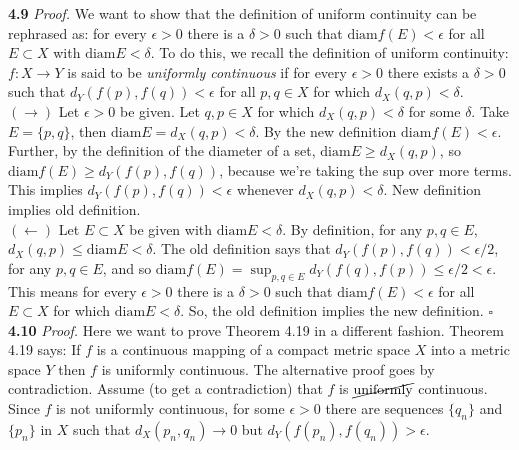 \documentclass[11pt]{article}
\begin{document}
\noindent \textbf{4.9}   
\noindent \textit{Proof.} We want to show that the definition of uniform continuity can be rephrased as: for every $\epsilon > 0$ there is a $\delta > 0$ such that $\text{diam} f(E) < \epsilon$ for all $E \subset X$ with $\text{diam}E < \delta$. To do this, we recall the definition of uniform continuity: $f: X \to Y$ is said to be \textit{uniformly continuous} if for every $\epsilon > 0$ there exists a $\delta > 0$ such that $d_Y(f(p), f(q)) < \epsilon$ for all $p,q \in X$ for which $d_X(q,p) < \delta$.\\

\noindent $(\rightarrow)$ Let $\epsilon > 0$ be given. Let $q,p\in X$ for which $d_X(q,p) < \delta$ for some $\delta$. Take $E = \{p,q \}$, then $\text{diam} E = d_X(q,p) < \delta$. By the new definition $\text{diam}f(E) < \epsilon$. Further, by the definition of the diameter of a set, $\text{diam}E \geq d_X(q,p)$, so $\text{diam} f(E) \geq d_Y (f(p), f(q))$, because we're taking the sup over more terms. This implies $d_Y(f(p), f(q)) < \epsilon$ whenever $d_X(q,p) < \delta$. New definition implies old definition. \\

\noindent $(\leftarrow)$  Let $E \subset X$ be given with $\text{diam}E < \delta$. By definition, for any $p,q \in E$, $d_X(q,p) \leq \text{diam} E < \delta $. The old definition says that $d_Y(f(p), f(q)) < \epsilon/2$, for any $p,q \in E$, and so $\text{diam} f(E) = \sup_{p,q\in E} d_Y(f(q), f(p)) \leq \epsilon/2 < \epsilon$. This means for every $\epsilon > 0$ there is a $\delta > 0$ such that $\text{diam} f(E) < \epsilon$ for all $E\subset X$ for which $\text{diam} E < \delta$. So, the old definition implies the new definition. \hfill $\square$\\  








\noindent \textbf{4.10}   
\noindent \textit{Proof.} Here we want to prove Theorem 4.19 in a different fashion. Theorem 4.19 says: If $f$ is a continuous mapping of a compact metric space $X$ into a metric space $Y$ then $f$ is uniformly continuous. The alternative proof goes by contradiction. Assume (to get a contradiction) that $f$ is $\cancel{\text{uniformly}}$ continuous. Since $f$ is not uniformly continuous, for some $\epsilon > 0$ there are sequences $\{ q_n\}$ and $\{ p_n\}$ in $X$ such that $d_X(p_n , q_n) \to 0$ but $d_Y(f(p_n), f(q_n)) > \epsilon$.   \\
\end{document}

